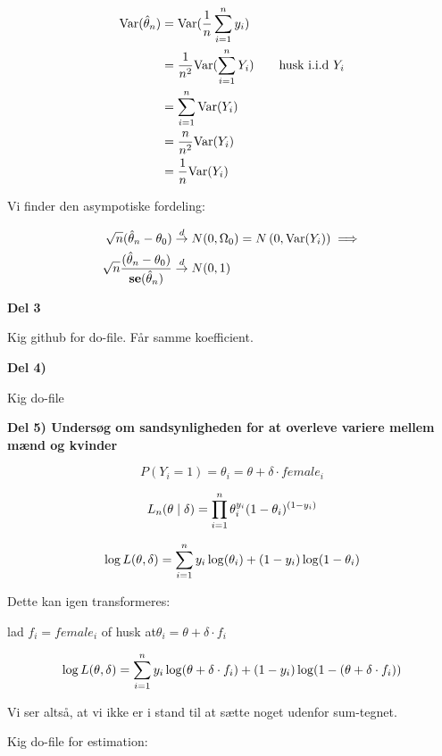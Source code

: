 \begin{align}
    \text{Var}(\hat{\theta}_n) &= \text{Var}(\frac{1}{n} \sum_{i=1}^{n} y_i) \\
    &= \frac{1}{n^2} \text{Var}(\sum_{i=1}^{n} Y_i) \qquad \text{husk i.i.d } Y_i\\
    &= \sum_{i=1}^{n} \text{Var}(Y_i) \\
    &= \frac{n}{n^2} \text{Var}(Y_i) \\
    &= \frac{1}{n} \text{Var}(Y_i)
\end{align}

Vi finder den asympotiske fordeling:

\begin{align}
    \sqrt{n} (\hat{\theta}_n - \theta_0) &\overset{d}{\rightarrow} N(0, \Omega_0) = N \left(0, \text{Var}(Y_i)\right)  \implies \\
    \sqrt{n} \frac{(\hat{\theta}_n - \theta_0)}{\textbf{se}(\hat{\theta}_n)} &\overset{d}{\rightarrow} N(0,1)
\end{align}

\textbf{Del 3}

Kig github for do-file. Får samme koefficient.

\textbf{Del 4)}

Kig do-file

\textbf{Del 5) Undersøg om sandsynligheden for at overleve variere mellem mænd og kvinder}

\begin{equation}
    P(Y_i = 1) = \theta_i = \theta + \delta \cdot female_i
\end{equation}

\begin{equation}
    L_n (\theta \mid \delta) = \prod_{i=1}^{n} \theta_i^{y_i} (1- \theta_i)^{(1-y_i)}
\end{equation}

\begin{equation}
\log L(\theta, \delta) = \sum_{i=1}^{n} y_i \log(\theta_i) + (1-y_i)\log(1 - \theta_i)
\end{equation}

Dette kan igen transformeres:

lad $f_i = female_i$ of husk at$\theta_i = \theta + \delta \cdot f_i$

\begin{equation}
    \log L (\theta, \delta) = \sum_{i=1}^{n} y_i \log(\theta + \delta\cdot f_i) + (1-y_i)\log(1 - (\theta + \delta \cdot f_i))
\end{equation}

Vi ser altså, at vi ikke er i stand til at sætte noget udenfor sum-tegnet.

Kig do-file for estimation:

